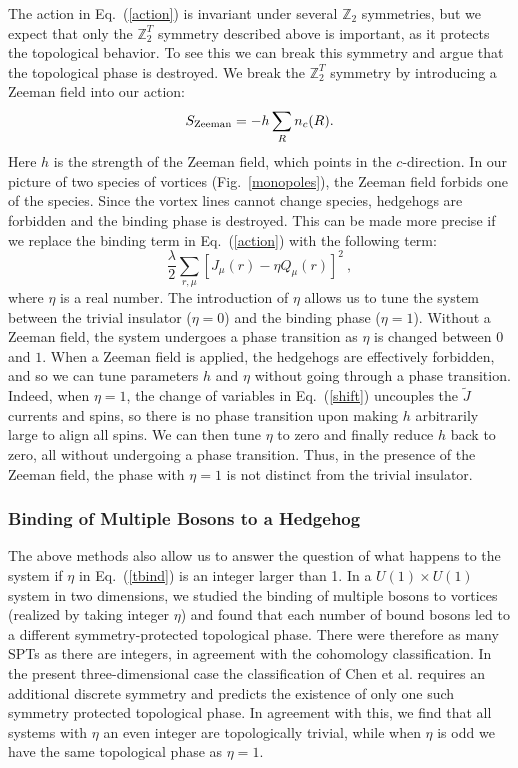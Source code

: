 \documentclass[prb,twocolumn]{revtex4-1}
\def\ztwo{\mathbb{Z}_2}
\def\ztwot{\mathbb{Z}_2^T}
\begin{document}
The action in Eq.~(\ref{action}) is invariant under several $\ztwo$ symmetries, but we expect that only the $\ztwot$ symmetry described above is important, as it protects the topological behavior. To see this we can break this symmetry and argue that the topological phase is destroyed.
We break the $\ztwot$ symmetry by introducing a Zeeman field into our action:
\begin{equation}
S_{\rm Zeeman}=-h\sum_R n_c(R).
\label{Zeeman}
\end{equation}
Here $h$ is the strength of the Zeeman field, which points in the $c$-direction. In our picture of two species of vortices (Fig.~\ref{monopoles}), the Zeeman field forbids one of the species. Since the vortex lines cannot change species, hedgehogs are forbidden and the binding phase is destroyed. 
This can be made more precise if we replace the binding term in Eq.~(\ref{action}) with the following term:
\begin{equation}
\frac{\lambda}{2}\sum_{r,\mu} [ J_\mu(r) - \eta Q_\mu(r)]^2 ~,
\label{tbind}
\end{equation}
where $\eta$ is a real number. The introduction of $\eta$ allows us to tune the system between the trivial insulator ($\eta=0$)  and the binding phase ($\eta=1$). Without a Zeeman field, the system undergoes a phase transition as $\eta$ is changed between $0$ and $1$. 
When a Zeeman field is applied, the hedgehogs are effectively forbidden, and so we can tune parameters $h$ and $\eta$ without going through a phase transition. Indeed, when $\eta=1$, the change of variables in Eq.~(\ref{shift}) uncouples the $\tilde{J}$ currents and spins, so there is no phase transition upon making $h$ arbitrarily large to align all spins. We can then tune $\eta$ to zero and finally reduce $h$ back to zero, all without undergoing a phase transition.  Thus, in the presence of the Zeeman field, the phase with $\eta=1$ is not distinct from the trivial insulator.


\subsubsection{Binding of Multiple Bosons to a Hedgehog}
The above methods also allow us to answer the question of what happens to the system if $\eta$ in Eq.~(\ref{tbind}) is an integer larger than 1.  In a $U(1)\times U(1)$ system in two dimensions, we studied the binding of multiple bosons to vortices (realized by taking integer $\eta$) and found that each number of bound bosons led to a different symmetry-protected topological phase.\cite{FQHE} There were therefore as many SPTs as there are integers, in agreement with the cohomology classification.\cite{WenScience,*WenPRB, LuVishwanath} In the present three-dimensional case the classification of Chen et al.\cite{WenScience,*WenPRB} requires an additional discrete symmetry and predicts the existence of only one such symmetry protected topological phase. In agreement with this, we find that all systems with $\eta$ an even integer are topologically trivial, while when $\eta$ is odd we have the same topological phase as $\eta=1$. 
\end{document}
